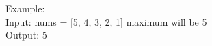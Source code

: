 \documentclass[preview]{standalone}
\begin{document}
Example:\\Input: nums = [5, 4, 3, 2, 1] maximum will be 5\\Output: 5\\
\end{document}
